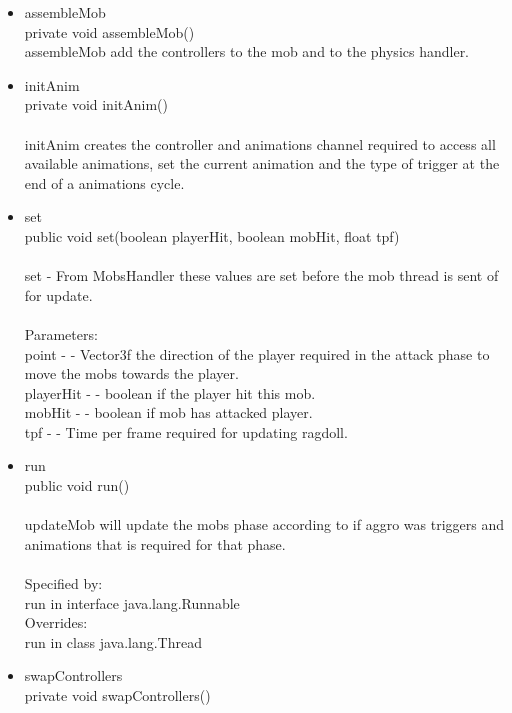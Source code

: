 \documentclass[letterpaper]{article}
\begin{document}
\begin{itemize}
\begin{itemize}
											\item	assembleMob \\
													private void assembleMob() \\
													assembleMob add the controllers to the mob and to the physics handler. \\
											\item	initAnim \\
													private void initAnim() \\ \\
													initAnim creates the controller and animations channel required to access all available animations, set the current animation and the type of trigger at the end of a animations cycle.
											\item	set \\
													public void set(boolean playerHit, boolean mobHit, float tpf) \\ \\
													set - From MobsHandler these values are set before the mob thread is sent of for update. \\ \\
													Parameters: \\
													point - - Vector3f the direction of the player required in the attack phase to move the mobs towards the player. \\
													playerHit - - boolean if the player hit this mob. \\
													mobHit - - boolean if mob has attacked player. \\
													tpf - - Time per frame required for updating ragdoll.
											\item	run \\
													public void run() \\ \\
													updateMob will update the mobs phase according to if aggro was triggers and animations that is required for that phase. \\ \\
													Specified by: \\
													run in interface java.lang.Runnable \\
													Overrides: \\
													run in class java.lang.Thread \\
											\item	swapControllers \\
													private void swapControllers() \\ \\

\end{itemize}
\end{itemize}
\end{document}
